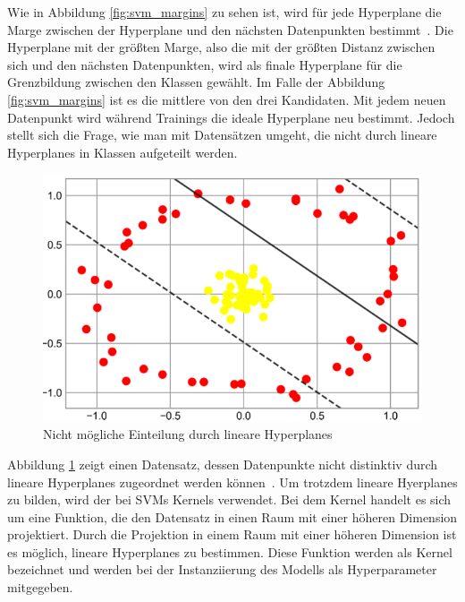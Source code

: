 Wie in Abbildung \ref{fig:svm_margins} zu sehen ist, wird für jede Hyperplane die Marge zwischen der Hyperplane und den nächsten Datenpunkten bestimmt~\cite[S. 438]{10.5555/3133359}.
Die Hyperplane mit der größten Marge, also die mit der größten Distanz zwischen sich und den nächsten Datenpunkten, wird als finale Hyperplane für die Grenzbildung zwischen den Klassen gewählt. Im Falle der Abbildung \ref{fig:svm_margins} ist es die mittlere von den drei Kandidaten. Mit jedem neuen Datenpunkt wird während Trainings  die ideale Hyperplane neu bestimmt.
Jedoch stellt sich die Frage, wie man mit Datensätzen umgeht, die nicht durch lineare Hyperplanes in Klassen aufgeteilt werden.

\pagebreak

\begin{figure}[h]
    \centering
    \includegraphics[scale=0.5]{figures/svm_non_linear.png}
    \caption{Nicht mögliche Einteilung durch lineare Hyperplanes}
    \label{fig:svm_non_linear}
\end{figure}


Abbildung \ref{fig:svm_non_linear} zeigt einen Datensatz, dessen Datenpunkte nicht distinktiv durch lineare Hyperplanes zugeordnet werden können~\cite[S. 441]{10.5555/3133359}. Um trotzdem lineare Hyerplanes zu bilden,
wird der bei SVMs Kernels verwendet. Bei dem Kernel handelt es sich um eine Funktion, die den Datensatz in einen Raum mit einer höheren Dimension projektiert.
Durch die Projektion in einem Raum mit einer höheren Dimension ist es möglich, lineare Hyperplanes zu bestimmen.
Diese Funktion werden als Kernel bezeichnet und werden bei der Instanziierung des Modells als Hyperparameter mitgegeben.

